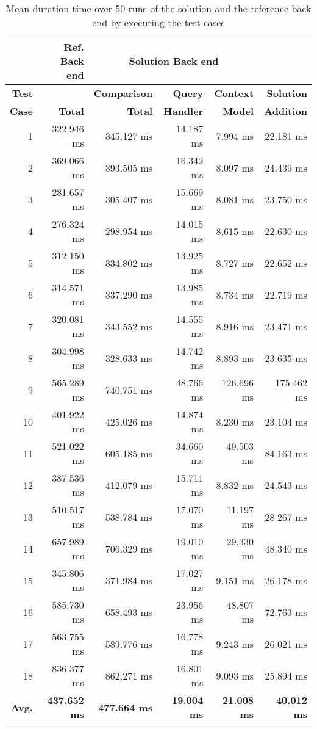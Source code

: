 \documentclass[draft,final]{vutinfth} %
\begin{document}
\begin{table}[]
	\caption{Mean duration time over 50 runs of the solution and the reference back end by executing the test cases}
	\centering
	\begin{tabular}{r|r|r|r|r|r}
		
		\textbf{} & \textbf{Ref. Back end} & \multicolumn{3}{c|}{\textbf{Solution Back end}} &  \\ \hline \textbf{Test} & \textbf{} & \textbf{Comparison} & \textbf{Query} & \textbf{Context} & \textbf{Solution} \\ 
		\textbf{Case} & \textbf{Total} & \textbf{Total} & \textbf{Handler} & \textbf{Model} & \textbf{Addition} \\ \hline
		1 & 322.946 ms & 345.127 ms & 14.187 ms & 7.994 ms & 22.181 ms \\ 
		2 & 369.066 ms & 393.505 ms & 16.342 ms & 8.097 ms & 24.439 ms \\ 
		3 & 281.657 ms & 305.407 ms & 15.669 ms & 8.081 ms & 23.750 ms \\ 
		4 & 276.324 ms & 298.954 ms & 14.015 ms & 8.615 ms & 22.630 ms \\ 
		5 & 312.150 ms & 334.802 ms & 13.925 ms & 8.727 ms & 22.652 ms \\ 
		6 & 314.571 ms & 337.290 ms & 13.985 ms & 8.734 ms & 22.719 ms \\ 
		7 & 320.081 ms & 343.552 ms & 14.555 ms & 8.916 ms & 23.471 ms \\ 
		8 & 304.998 ms & 328.633 ms & 14.742 ms & 8.893 ms & 23.635 ms \\ 
		9 & 565.289 ms & 740.751 ms & 48.766 ms & 126.696 ms & 175.462 ms \\ 
		10 & 401.922 ms & 425.026 ms & 14.874 ms & 8.230 ms & 23.104 ms \\ 
		11 & 521.022 ms & 605.185 ms & 34.660 ms & 49.503 ms & 84.163 ms \\ 
		12 & 387.536 ms & 412.079 ms & 15.711 ms & 8.832 ms & 24.543 ms \\ 
		13 & 510.517 ms & 538.784 ms & 17.070 ms & 11.197 ms & 28.267 ms \\ 
		14 & 657.989 ms & 706.329 ms & 19.010 ms & 29.330 ms & 48.340 ms  \\ 
		15 & 345.806 ms & 371.984 ms & 17.027 ms & 9.151 ms & 26.178 ms \\ 
		16 & 585.730 ms & 658.493 ms & 23.956 ms & 48.807 ms & 72.763 ms \\ 
		17 & 563.755 ms & 589.776 ms & 16.778 ms & 9.243 ms & 26.021 ms \\ 
		18 & 836.377 ms & 862.271 ms & 16.801 ms & 9.093 ms & 25.894 ms \\ \hline
		\textbf{Avg.} & \textbf{437.652 ms} & \textbf{477.664 ms} & \textbf{19.004 ms} & \textbf{21.008 ms} & \textbf{40.012 ms} \\ 
	\end{tabular}
	\label{Tab:eva_performance}
\end{table}
\end{document}
